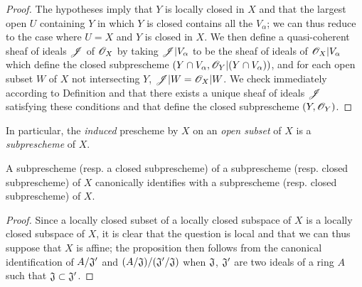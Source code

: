 \begin{proof}
\label{proof-1.4.1.5}
The hypotheses imply that $Y$ is locally closed in $X$ and that the largest open $U$ containing $Y$ in which $Y$ is closed contains all the $V_\alpha$; we can thus reduce to the case where $U=X$ and $Y$ is closed in $X$.
We then define a quasi-coherent sheaf of ideals $\mathscr{J}$ of $\mathscr{O}_X$ by taking $\mathscr{J}|V_\alpha$ to be the sheaf of ideals of $\mathscr{O}_X|V_\alpha$ which define the closed subprescheme $(Y\cap V_\alpha,\mathscr{O}_Y|(Y\cap V_\alpha))$, and for each open subset $W$ of $X$ not intersecting $Y$, $\mathscr{J}|W=\mathscr{O}_X|W$.
We check immediately according to Definition  and  that there exists a unique sheaf of ideals $\mathscr{J}$ satisfying these conditions and that define the closed subprescheme $(Y,\mathscr{O}_Y)$.
\end{proof}

In particular, the \emph{induced} prescheme by $X$ on an \emph{open subset} of $X$ is a \emph{subprescheme} of $X$.

\begin{prop}[4.1.6]
\label{1.4.1.6}
A subprescheme (resp. a closed subprescheme) of a subprescheme
(resp. closed subprescheme) of $X$ canonically identifies with a subprescheme (resp. closed subprescheme) of $X$.
\end{prop}

\begin{proof}
\label{proof-1.4.1.6}
Since a locally closed subset of a locally closed subspace of $X$ is a locally closed subspace of $X$, it is clear  that the question is local and that we can thus suppose that $X$ is affine; the proposition then follows from the canonical identification of $A/\mathfrak{J}'$ and $(A/\mathfrak{J})/(\mathfrak{J}'/\mathfrak{J})$ when $\mathfrak{J}$, $\mathfrak{J}'$ are two ideals of a ring $A$ such that $\mathfrak{J}\subset\mathfrak{J}'$.
\end{proof}

